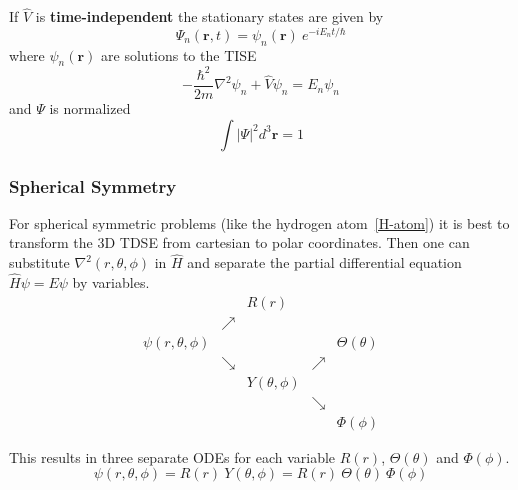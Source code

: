 If $\widehat{V}$ is \textbf{time-independent} the stationary states are given by
\begin{equation*}
    \Psi_n(\mathbf{r},t)=\psi_n(\mathbf{r})\:e^{-iE_n t/\hbar}
\end{equation*}
where $\psi_n(\mathbf{r})$ are solutions to the TISE
\begin{equation*}
    -\frac{\hbar^2}{2m}\nabla^2\psi_n + \widehat{V}\psi_n = E_n \psi_n
\end{equation*}
and $\Psi$ is normalized
\noindent\begin{equation*}
    \int|\Psi|^2 d^3\mathbf{r}=1
\end{equation*}

\subsubsection{Spherical Symmetry}\label{3dSE_spherical_symmetry}
For spherical symmetric problems (like the hydrogen atom~\ref{H-atom}) it is best to transform the 3D TDSE from cartesian to polar coordinates. Then one can substitute $\nabla^2(r, \theta, \phi)$ in $\widehat{H}$ and separate the partial differential equation $\widehat{H}\psi = E\psi$ by variables.
\renewcommand{\arraystretch}{0.7}
\setlength{\oldtabcolsep}{\tabcolsep}\setlength\tabcolsep{0pt}
\begin{equation*}
    \begin{matrix}
                            &          & R(r)            &          &                \\
                            & \nearrow &                 &          &                \\
        \psi(r,\theta,\phi) &          &                 &          & \Theta(\theta) \\
                            & \searrow &                 & \nearrow &                \\
                            &          & Y(\theta, \phi) &          &                \\
                            &          &                 & \searrow &                \\
                            &          &                 &          & \Phi(\phi)
    \end{matrix}
\end{equation*}
\renewcommand{\arraystretch}{1}
\setlength\tabcolsep{\oldtabcolsep}

This results in three separate ODEs for each variable $R(r)$, $\Theta(\theta)$ and $\Phi(\phi)$.
\begin{equation*}
    \psi(r,\theta,\phi) = R(r)\:Y(\theta, \phi) = R(r)\:\Theta(\theta)\:\Phi(\phi)
\end{equation*}

